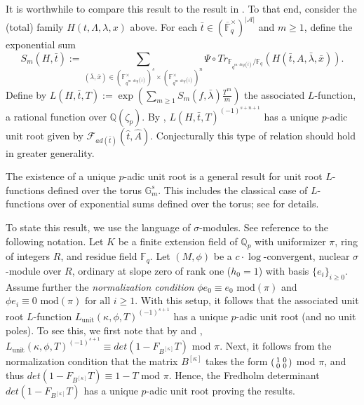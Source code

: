 \documentclass{article}
\theoremstyle{remark}
\def\bb #1{ {\mathbb #1} }
\def\c #1{ {\mathcal #1} }
\newenvironment{psmallmatrix}
  {\left(\begin{smallmatrix}}
  {\end{smallmatrix}\right)}
\begin{document}
\medskip{} It is worthwhile to compare this result to the result in \cite{MR2966711}. To that end, consider the (total) family $H(t, \Lambda, \lambda, x)$ above. For each $\bar t \in (\overline{\bb F}_q^\times)^{|\c A|}$ and $m \geq 1$, define the exponential sum
\[
S_m(H, \bar t) := \sum_{(\bar \lambda, \bar x) \in (\bb F_{q^{m \cdot deg(\bar t)}}^\times)^s \times (\bb F_{q^{m \cdot deg(\bar t)}}^\times)^n} \Psi\circ Tr_{\bb F_{q^{m \cdot deg(\bar t)}} / \bb F_q}(H(\bar t, A, \bar \lambda, \bar x)).
\]
Define by $L(H, \bar t, T) := \exp( \sum_{m \geq 1} S_m(f, \bar \lambda) \frac{T^m}{m})$ the associated $L$-function, a rational function over $\bb Q(\zeta_p)$. By \cite{MR2966711}, $L(H, \bar t, T)^{(-1)^{s+n+1}}$ has a unique $p$-adic unit root given by $\c F_{a d(\bar t)}(\hat t, \hat A)$. Conjecturally this type of relation should hold in greater generality.


\medskip{} The existence of a unique $p$-adic unit root is a general result for unit root $L$-functions defined over the torus $\bb G_m^s$. This includes the classical case of $L$-functions over of exponential sums defined over the torus; see \cite[Section 3]{MR3249829} for details. 

To state this result, we use the language of $\sigma$-modules. See \cite{MR3249829} reference to the following notation.  Let $K$ be a finite extension field of $\bb Q_p$ with uniformizer $\pi$, ring of integers $R$, and residue field $\bb F_q$. Let $(M, \phi)$ be a $c \cdot \log$-convergent, nuclear $\sigma$-module over $R$, ordinary at slope zero of rank one ($h_0 = 1$) with basis $\{ e_i \}_{i \geq 0}$. Assume further the \emph{normalization condition} $\phi e_0 \equiv e_0 \text{ mod}(\pi)$ and $\phi e_i \equiv 0 \text{ mod}(\pi) \text{ for all } i \geq 1$. With this setup, it follows that the associated unit root $L$-function $L_\text{unit}(\kappa, \phi, T)^{(-1)^{s+1}}$ has a unique $p$-adic unit root (and no unit poles). To see this, we first note that by \cite[Lemma 2.1]{MR3249829} and \cite[equation (9)]{MR3249829}, $L_\text{unit}(\kappa, \phi, T)^{(-1)^{s+1}} \equiv det(1 - F_{B^{[\kappa]}} T)$ mod $\pi$. Next, it follows from the normalization condition that the matrix $B^{[\kappa]}$ takes the form $\begin{psmallmatrix}1 & 0\\0 &0 \end{psmallmatrix}$ mod $\pi$, and thus $det(1 - F_{B^{[\kappa]}} T) \equiv 1 - T$ mod $\pi$. Hence, the Fredholm determinant $det(1 - F_{B^{[\kappa]}} T)$ has a unique $p$-adic unit root proving the results.
\end{document}
